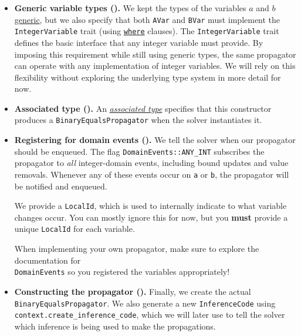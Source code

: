 \documentclass{article}
\begin{document}
\begin{itemize}
    \item 
        \textbf{Generic variable types ().}  
          We kept the types of the variables $a$ and $b$ \href{https://doc.rust-lang.org/book/ch10-01-syntax.html}{generic}, but we also specify that both \texttt{AVar} and \texttt{BVar} must implement the \texttt{IntegerVariable} trait (using \href{https://doc.rust-lang.org/book/ch10-02-traits.html#clearer-trait-bounds-with-where-clauses}{\texttt{where}} clauses).
          The \texttt{IntegerVariable} trait defines the basic interface that any integer variable must provide.
          By imposing this requirement while still using generic types, the same propagator can operate with any implementation of integer variables.
          We will rely on this flexibility without exploring the underlying type system in more detail for now.

    \item 
        \textbf{Associated type ().}  
          An \href{https://doc.rust-lang.org/book/ch20-02-advanced-traits.html#associated-types}{\emph{associated type}} specifies that this constructor produces a \texttt{Binary\-Equals\-Propagator} when the solver instantiates it.

    \item 
        \textbf{Registering for domain events ().}  
          We tell the solver when our propagator should be enqueued.
          The flag \texttt{DomainEvents::ANY\_INT} subscribes the propagator to \emph{all} integer-domain events, including bound updates and value removals.
          Whenever any of these events occur on \texttt{a} or \texttt{b}, the propagator will be notified and enqueued.

          We provide a \texttt{LocalId}, which is used to internally indicate to what variable changes occur.
          You can mostly ignore this for now, but you \textbf{must} provide a unique \texttt{LocalId} for each variable.
          
          When implementing your own propagator, make sure to explore the documentation for \\ \texttt{DomainEvents} so you registered the variables appropriately!

    \item 
        \textbf{Constructing the propagator ().}  
          Finally, we create the actual \\ \texttt{BinaryEqualsPropagator}.  
          We also generate a new \texttt{InferenceCode} using \\
          \texttt{context.create\_inference\_code}, which we will later use to tell the solver which inference is being used to make the propagations.
\end{itemize}
\end{document}
